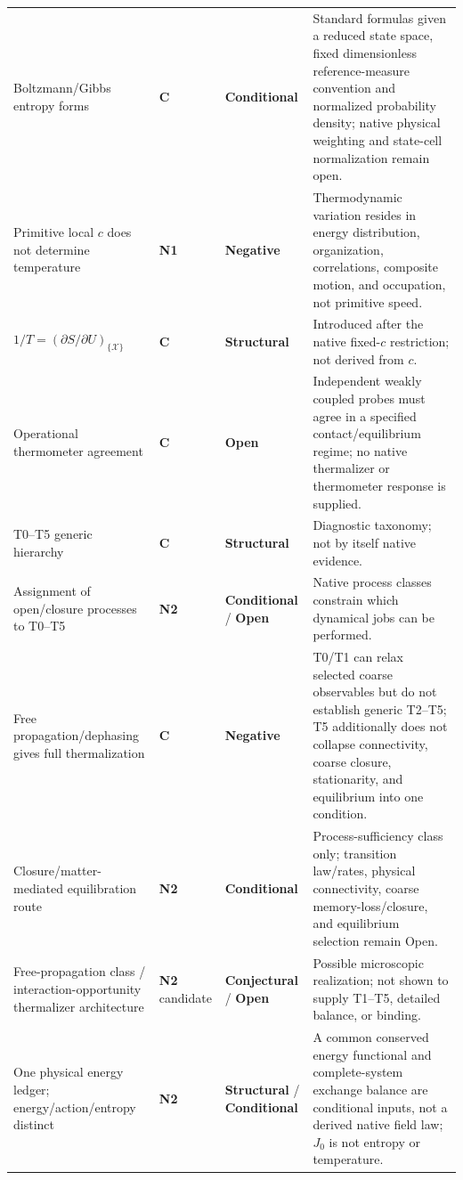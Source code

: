 \documentclass[11pt]{article}
\theoremstyle{definition}
\newcommand{\statusStructural}{\textcolor{blue!55!black}{\textbf{Structural}}}
\newcommand{\statusConditional}{\textcolor{yellow!60!black}{\textbf{Conditional}}}
\newcommand{\statusConjectural}{\textcolor{magenta!65!black}{\textbf{Conjectural}}}
\newcommand{\statusOpen}{\textcolor{red!75!black}{\textbf{Open}}}
\newcommand{\statusNegative}{\textcolor{red!65!black}{\textbf{Negative}}}
\newcommand{\natNOne}{\textcolor{blue!70!black}{\textbf{N1}}}
\newcommand{\natNTwo}{\textcolor{teal!70!black}{\textbf{N2}}}
\newcommand{\natControl}{\textcolor{gray!75!black}{\textbf{C}}}
\begin{document}
\begin{center}
\begin{longtable}{@{}P{3.5cm}P{1.7cm}P{2.5cm}P{5.6cm}@{}}
Boltzmann/Gibbs entropy forms
& \natControl{} & \statusConditional{}
& Standard formulas given a reduced state space, fixed dimensionless reference-measure convention and normalized probability density; native physical weighting and state-cell normalization remain open. \\
Primitive local $c$ does not determine temperature
& \natNOne{} & \statusNegative{}
& Thermodynamic variation resides in energy distribution, organization, correlations, composite motion, and occupation, not primitive speed. \\
$1/T=\left(\partial S/\partial U\right)_{\{\mathcal X\}}$
& \natControl{} & \statusStructural{}
& Introduced after the native fixed-$c$ restriction; not derived from $c$. \\
Operational thermometer agreement
& \natControl{} & \statusOpen{}
& Independent weakly coupled probes must agree in a specified contact/equilibrium regime; no native thermalizer or thermometer response is supplied. \\
T0--T5 generic hierarchy
& \natControl{} & \statusStructural{}
& Diagnostic taxonomy; not by itself native evidence. \\
Assignment of open/closure processes to T0--T5
& \natNTwo{} & \statusConditional{} / \statusOpen{}
& Native process classes constrain which dynamical jobs can be performed. \\
Free propagation/dephasing gives full thermalization
& \natControl{} & \statusNegative{}
& T0/T1 can relax selected coarse observables but do not establish generic T2--T5; T5 additionally does not collapse connectivity, coarse closure, stationarity, and equilibrium into one condition. \\
Closure/matter-mediated equilibration route
& \natNTwo{} & \statusConditional{}
& Process-sufficiency class only; transition law/rates, physical connectivity, coarse memory-loss/closure, and equilibrium selection remain Open. \\
Free-propagation class / interaction-opportunity thermalizer architecture
& \natNTwo{} candidate & \statusConjectural{} / \statusOpen{}
& Possible microscopic realization; not shown to supply T1--T5, detailed balance, or binding. \\
One physical energy ledger; energy/action/entropy distinct
& \natNTwo{} & \statusStructural{} / \statusConditional{}
& A common conserved energy functional and complete-system exchange balance are conditional inputs, not a derived native field law; $J_0$ is not entropy or temperature. \\

\end{longtable}
\end{center}
\end{document}
